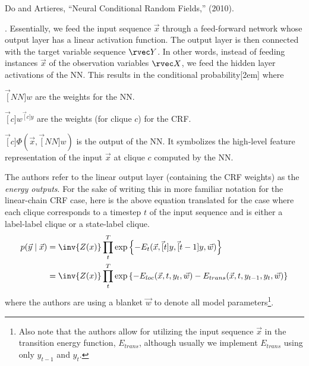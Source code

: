 \documentclass[11pt]{article}
\begin{document}
\vspace{-1em}
{\footnotesize Do and Artieres, ``Neural Conditional Random Fields,'' (2010).}


\p {}. Essentially, we feed the input sequence $\vec x$ through a feed-forward network whose output layer has a linear activation function. The output layer is then connected with the target variable sequence $\rvec Y$. In other words, instead of feeding instances $\vec x$ of the observation variables $\rvec X$, we feed the hidden layer activations of the NN. This results in the conditional probability[2em]
where
\begin{compactitem}
	\item $\vec[NN]{w}$ are the weights for the NN. 
	\item $\vec[c]{w}^{\vec[c]{y}}$ are the weights (for clique $c$) for the CRF. 
	\item $ \vec[c]{\Phi}(\vec x, \vec[NN]{w}) $ is the output of the NN. It symbolizes the high-level feature representation of the input $\vec x$ at clique $c$ computed by the NN. 
\end{compactitem}
The authors refer to the linear output layer (containing the CRF weights) as the \textit{energy outputs}. For the sake of writing this in more familiar notation for the linear-chain CRF case, here is the above equation translated for the case where  each clique corresponds to a timestep $t$ of the input sequence and is either a label-label clique or a state-label clique. 
\begin{align}
p(\vec y \mid \vec x) &= \inv{Z(x)} \prod_t^T \exp\left\{ - E_t(\vec x, \vec[t]{y}, \vec[t-1]{y}, \vec w) \right\} \\
&= \inv{Z(x)} \prod_t^T \exp\left\{ -E_{loc}(\vec x, t, y_t, \vec w) - E_{trans}(\vec x, t, y_{t-1}, y_t, \vec w)  \right\} \\
\end{align}
where the authors are using a blanket $\vec w$ to denote all model parameters\footnote{Also note that the authors allow for utilizing the input sequence $\vec x$ in the transition energy function, $E_{trans}$, although usually we implement $E_{trans}$ using only $y_{t-1}$ and $y_{t}$.}.
\end{document}

